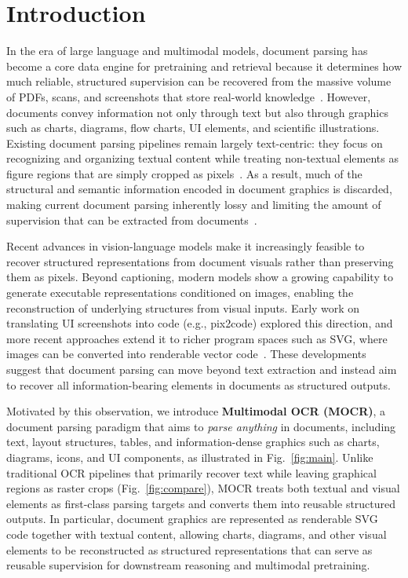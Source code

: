 \documentclass{article}
\begin{document}
\section{Introduction}
\label{sec:intro}
In the era of large language and multimodal models, document parsing has become a core data engine for pretraining and retrieval because it determines how much reliable, structured supervision can be recovered from the massive volume of PDFs, scans, and screenshots that store real-world knowledge~\cite{huang2022layoutlmv3}. However, documents convey information not only through text but also through graphics such as charts, diagrams, flow charts, UI elements, and scientific illustrations. Existing document parsing pipelines remain largely text-centric: they focus on recognizing and organizing textual content while treating non-textual elements as figure regions that are simply cropped as pixels~\cite{ouyang2025omnidocbench}. As a result, much of the structural and semantic information encoded in document graphics is discarded, making current document parsing inherently lossy and limiting the amount of supervision that can be extracted from documents~\cite{li2025monkeyocr,niu2025mineru2}.

Recent advances in vision-language models make it increasingly feasible to recover structured representations from document visuals rather than preserving them as pixels. Beyond captioning, modern models show a growing capability to generate executable representations conditioned on images, enabling the reconstruction of underlying structures from visual inputs. Early work on translating UI screenshots into code (e.g., pix2code) explored this direction, and more recent approaches extend it to richer program spaces such as SVG, where images can be converted into renderable vector code~\cite{beltramelli2018pix2code,rodriguez2025starvector}. These developments suggest that document parsing can move beyond text extraction and instead aim to recover all information-bearing elements in documents as structured outputs.

Motivated by this observation, we introduce \textbf{Multimodal OCR (MOCR)}, a document parsing paradigm that aims to \textit{parse anything} in documents, including text, layout structures, tables, and information-dense graphics such as charts, diagrams, icons, and UI components, as illustrated in Fig.~\ref{fig:main}. Unlike traditional OCR pipelines that primarily recover text while leaving graphical regions as raster crops (Fig.~\ref{fig:compare}), MOCR treats both textual and visual elements as first-class parsing targets and converts them into reusable structured outputs. In particular, document graphics are represented as renderable SVG code together with textual content, allowing charts, diagrams, and other visual elements to be reconstructed as structured representations that can serve as reusable supervision for downstream reasoning and multimodal pretraining.
\end{document}
